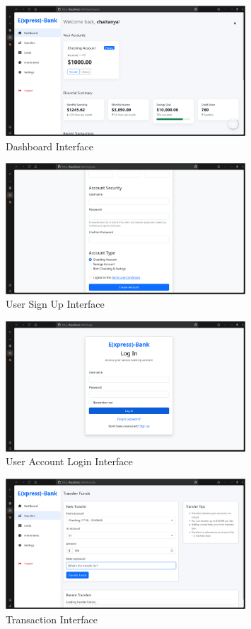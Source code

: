 \begin{figure}[h]
    \centering
    \includegraphics[width=0.8\textwidth]{express_assets/dashboard.png}
    \caption{Dashboard Interface}
\end{figure}

\begin{figure}[h]
    \centering
    \includegraphics[width=0.8\textwidth]{express_assets/register.png}
    \caption{User Sign Up Interface}
\end{figure}

\begin{figure}[h]
    \centering
    \includegraphics[width=0.8\textwidth]{express_assets/login.png}
    \caption{User Account Login Interface}
\end{figure}

\begin{figure}[h]
    \centering
    \includegraphics[width=0.8\textwidth]{express_assets/transfers.png}
    \caption{Transaction Interface}
\end{figure}

